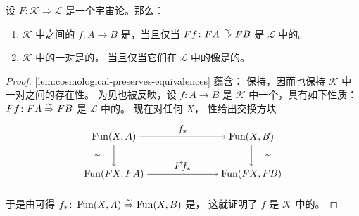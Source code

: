 \begin{lemma}\label{lem:biequivalence-reflect-create}
设 $F\colon\mathcal{K}\Rightarrow\mathcal{L}$
是一个宇宙论\trBiequivalence{}。那么：
\begin{enumerate}[label=(\roman*)]
\item $\mathcal{K}$ 中\trInfinityCategory{}之间的\trFunctor{}
  $f\colon A\to B$ 是\trEquivalence{}，当且仅当
  $Ff\colon FA\mathrel{\stackrel{\sim}{\Rightarrow}} FB$ 是 $\mathcal{L}$ 中的\trEquivalence{}。
\item $\mathcal{K}$ 中的一对\trInfinityCategory{}是\trEquivalence{}的，
  当且仅当它们在 $\mathcal{L}$ 中的像是\trEquivalence{}的。
\end{enumerate}
\end{lemma}
\begin{proof}
\cref{lem:cosmological-preserves-equivalences} 蕴含：
\trCosmologicalFunctor{}保持\trEquivalence{}，因而也保持 $\mathcal{K}$ 中
一对\trInfinityCategory{}之间\trEquivalence{}的存在性。
为见\trEquivalence{}也被反映，设 $f\colon A\to B$
是 $\mathcal{K}$ 中一个\trFunctor{}，具有如下性质：
$Ff\colon FA\mathrel{\stackrel{\sim}{\Rightarrow}} FB$ 是 $\mathcal{L}$ 中的\trEquivalence{}。
现在对任何\trInfinityCategory{} $X$，
\trSimplicialFunctor{}性给出交换方块
\begin{equation*}
\begin{tikzpicture}[xscale=1.75,yscale=1.35]
\node (TL) at (0,1) {$\Fun(X,A)$};
\node (TR) at (2.8,1) {$\Fun(X,B)$};
\node (BL) at (0,0) {$\Fun(FX,FA)$};
\node (BR) at (2.8,0) {$\Fun(FX,FB)$};
\draw[->] (TL) -- (TR) node[midway,above]{$f_\ast$};
\draw[->] (TL) -- (BL);
\node at (-0.34,0.5) {$\scriptstyle\sim$};
\draw[->] (TR) -- (BR);
\node at (3.14,0.5) {$\scriptstyle\sim$};
\draw[->] (BL) -- (BR) node[midway,above]{$Ff_\ast$};
\node at (1.4,0.3) {$\scriptstyle\sim$};
\end{tikzpicture}
\end{equation*}

于是由\trTwoOfThreeProperty{}可得
$f_\ast\colon\operatorname{Fun}(X,A)\mathrel{\stackrel{\sim}{\Rightarrow}}\operatorname{Fun}(X,B)$ 是\trEquivalence{}，
这就证明了 $f$ 是 $\mathcal{K}$ 中的\trEquivalence{}。


\end{proof}
